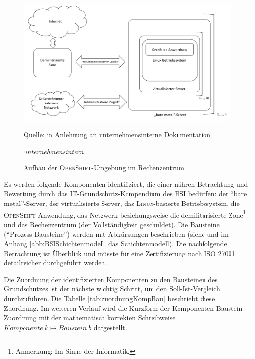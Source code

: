 \begin{figure}[h!]
	\centering
	\includegraphics[scale=0.45]{img/aufbauOpenShiftServerUmgebung.pdf}
	\caption{Aufbau der \textsc{OpenShift}-Umgebung im Rechenzentrum}
	\label{abb:aufbauServerUmgebung}
	{\footnotesize Quelle: in Anlehnung an unternehmensinterne Dokumentation\par}
	{\footnotesize \textit{unternehmensintern}}
\end{figure}

Es werden folgende Komponenten identifiziert, die einer nähren Betrachtung und Bewertung durch das IT-Grundschutz-Kompendium des \ac{BSI} bedürfen: der \enquote{bare metal}-Server, der virtualisierte Server, das \textsc{Linux}-basierte Betriebssystem, die \textsc{OpenShift}-Anwendung, das Netzwerk beziehungsweise die demilitarisierte Zone\footnote{Anmerkung: Im Sinne der Informatik.} und das Rechenzentrum (der Vollständigkeit geschuldet). Die Bausteine (\enquote{Prozess-Bausteine}) werden mit Abkürzungen beschrieben (siehe \cite[][S.\,2-4]{bundesamt_fur_sicherheit_in_der_informationstechnik_bsi_it-grundschutz-kompendium_2020} und im Anhang \vref{abb:BSISchichtenmodell} das Schichtenmodell). Die nachfolgende Betrachtung ist Überblick und müsste für eine Zertifizierung nach ISO 27001 detailreicher durchgeführt werden.
\par
Die Zuordnung der identifizierten Komponenten zu den Bausteinen des Grundschutzes ist der nächste wichtig Schritt, um den Soll-Ist-Vergleich durchzuführen. Die Tabelle \vref{tab:zuordnungKompBau} beschriebt diese Zuordnung. Im weiteren Verlauf wird die Kurzform der Komponenten-Baustein-Zuordnung mit der mathematisch korrekten Schreibweise $ Komponente\ k \mapsto Baustein\ b $ dargestellt.
\par

